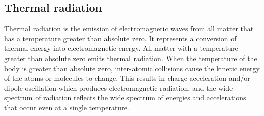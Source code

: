%
%
%
%
%
%
%


\subsection{Thermal radiation}
\noindent
Thermal radiation is the emission of electromagnetic waves from all matter that has a temperature greater than absolute zero.
It represents a conversion of thermal energy into electromagnetic energy.
All matter with a temperature greater than absolute zero emits thermal radiation. When the temperature of the body is greater than absolute zero, inter-atomic collisions cause the kinetic energy of the atoms or molecules to change. This results in charge-acceleration and/or dipole oscillation which produces electromagnetic radiation, and the wide spectrum of radiation reflects the wide spectrum of energies and accelerations that occur even at a single temperature.

